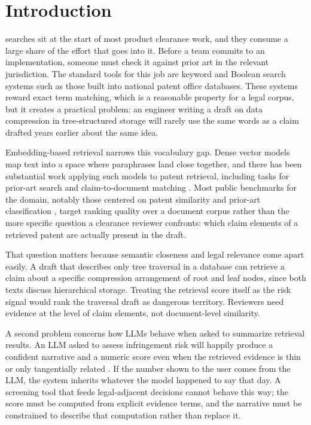 \documentclass[journal]{IEEEtran}
\begin{document}
\section{Introduction}
 searches sit at the start of most product clearance work, and they consume a large share of the effort that goes into it. Before a team commits to an implementation, someone must check it against prior art in the relevant jurisdiction. The standard tools for this job are keyword and Boolean search systems such as those built into national patent office databases. These systems reward exact term matching, which is a reasonable property for a legal corpus, but it creates a practical problem: an engineer writing a draft on data compression in tree-structured storage will rarely use the same words as a claim drafted years earlier about the same idea.

Embedding-based retrieval narrows this vocabulary gap. Dense vector models map text into a space where paraphrases land close together, and there has been substantial work applying such models to patent retrieval, including tasks for prior-art search and claim-to-document matching \cite{reimers2019sentence, patentbert, patentsberta}. Most public benchmarks for the domain, notably those centered on patent similarity and prior-art classification \cite{behn-etal-2019-patent}, target ranking quality over a document corpus rather than the more specific question a clearance reviewer confronts: which claim elements of a retrieved patent are actually present in the draft.

That question matters because semantic closeness and legal relevance come apart easily. A draft that describes only tree traversal in a database can retrieve a claim about a specific compression arrangement of root and leaf nodes, since both texts discuss hierarchical storage. Treating the retrieval score itself as the risk signal would rank the traversal draft as dangerous territory. Reviewers need evidence at the level of claim elements, not document-level similarity.

A second problem concerns how LLMs behave when asked to summarize retrieval results. An LLM asked to assess infringement risk will happily produce a confident narrative and a numeric score even when the retrieved evidence is thin or only tangentially related \cite{lewis2020rag, tonmoy2022hallucination}. If the number shown to the user comes from the LLM, the system inherits whatever the model happened to say that day. A screening tool that feeds legal-adjacent decisions cannot behave this way; the score must be computed from explicit evidence terms, and the narrative must be constrained to describe that computation rather than replace it.
\end{document}

